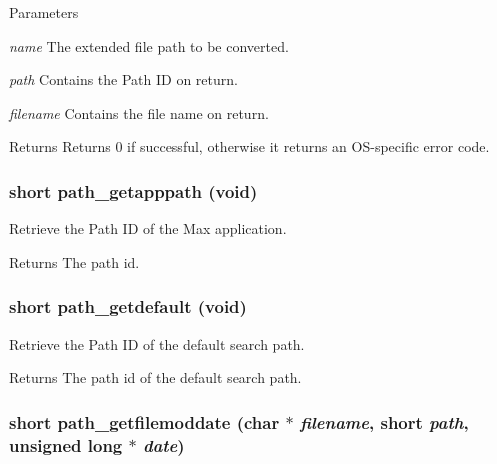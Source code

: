 \begin{DoxyParams}{Parameters}
\item[{\em name}]The extended file path to be converted. \item[{\em path}]Contains the Path ID on return. \item[{\em filename}]Contains the file name on return. \end{DoxyParams}
\begin{DoxyReturn}{Returns}
Returns 0 if successful, otherwise it returns an OS-\/specific error code. 
\end{DoxyReturn}
\hypertarget{group__files_gafa1b5d658654eb52b748c0b94200f393}{
\subsubsection[{path\_\-getapppath}]{\setlength{\rightskip}{0pt plus 5cm}short path\_\-getapppath (void)}}
\label{group__files_gafa1b5d658654eb52b748c0b94200f393}


Retrieve the Path ID of the Max application. \begin{DoxyReturn}{Returns}
The path id. 
\end{DoxyReturn}
\hypertarget{group__files_ga6be29f366820a4cd2aa4f77bcfad362e}{
\subsubsection[{path\_\-getdefault}]{\setlength{\rightskip}{0pt plus 5cm}short path\_\-getdefault (void)}}
\label{group__files_ga6be29f366820a4cd2aa4f77bcfad362e}


Retrieve the Path ID of the default search path. \begin{DoxyReturn}{Returns}
The path id of the default search path. 
\end{DoxyReturn}
\hypertarget{group__files_ga834e354ef2df52e88d0643e503c4bf6c}{
\subsubsection[{path\_\-getfilemoddate}]{\setlength{\rightskip}{0pt plus 5cm}short path\_\-getfilemoddate (char $\ast$ {\em filename}, \/  short {\em path}, \/  unsigned long $\ast$ {\em date})}}
\label{group__files_ga834e354ef2df52e88d0643e503c4bf6c}


